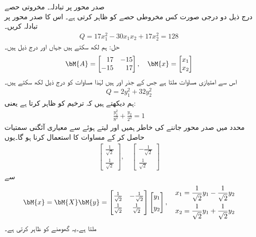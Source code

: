 \quad صدر محور پر تبادلہ۔ مخروتی حصے\\
درج ذیل دو درجی صورت کس مخروطی حصے کو ظاہر کرتی ہے۔ اس کا صدر محور پر تبادلہ کریں۔
\begin{align*}
Q=17x_1^2-30x_1x_2+17x_2^2=128
\end{align*} 
حل: ہم  لکھ سکتے ہیں جہاں  اور  درج ذیل ہیں۔
\begin{align*}
\bM{A}=\begin{bmatrix*}[r]17&-15\\-15&17  \end{bmatrix*},\quad \bM{x}=\begin{bmatrix} x_1\\x_2 \end{bmatrix}
\end{align*}
اس سے امتیازی مساوات  ملتا ہے جس کے جذر  اور  ہیں لہٰذا مساوات  کو درج ذیل لکھ سکتے ہیں۔
\begin{align*}
Q=2y_1^2+32y_2^2
\end{align*}
ہم دیکھتے ہیں کہ   ترخیم  کو ظاہر کرتا ہے یعنی:
\begin{align*}
\frac{y_1^2}{8^2}+\frac{y_2}{2^2}=1
\end{align*}
 محدد میں صدر محور جاننے کی خاطر ہمیں  اور  لیتے ہوئے
  سے معیاری آئگنی سمتیات حاصل کر کے مساوات   کا استعمال کرنا ہو گا۔یوں
\begin{align*}
\begin{bmatrix}  \frac{1}{\sqrt{2}}\\[0.5em] \frac{1}{\sqrt{2}}\end{bmatrix}, \quad \begin{bmatrix}  -\frac{1}{\sqrt{2}}\\[0.5em] \frac{1}{\sqrt{2}}\end{bmatrix}
\end{align*}
سے
\begin{gather*}
\bM{x}=\bM{X}\bM{y}=\begin{bmatrix}\frac{1}{\sqrt{2}}&-\frac{1}{\sqrt{2}}\\[0.5em] \frac{1}{\sqrt{2}}&\frac{1}{\sqrt{2}} \end{bmatrix}\begin{bmatrix} y_1\\[0.5em]y_2 \end{bmatrix},\quad \begin{aligned}  x_1=\frac{1}{\sqrt{2}}y_1-\frac{1}{\sqrt{2}}y_2\\ x_2=\frac{1}{\sqrt{2}}y_1+\frac{1}{\sqrt{2}}y_2\end{aligned}
\end{gather*}
ملتا ہے۔یہ  گھومنے کو ظاہر کرتی ہے۔

